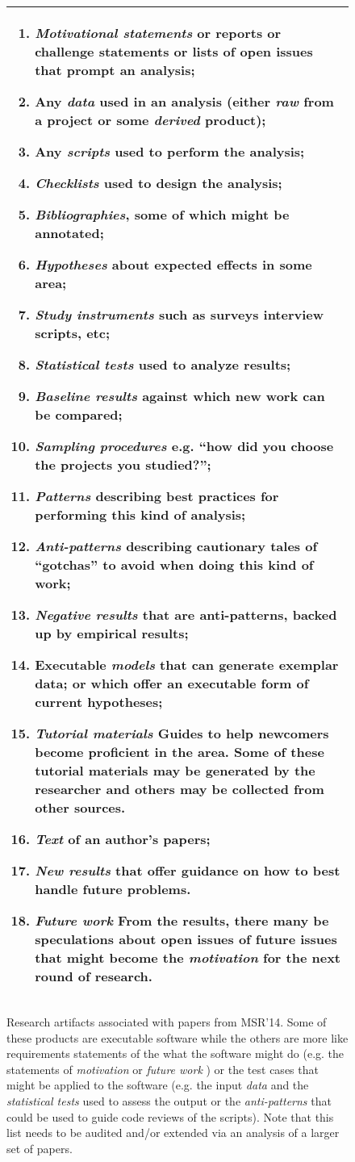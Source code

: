 \documentclass[journal]{IEEEtran}
\newcommand{\be}{\begin{enumerate}}
\newcommand{\ee}{\end{enumerate}}
\begin{document}
\begin{figure}[!t]
\begin{tabular}{|p{.95\linewidth}|}\hline
\small
\be
\item {\em Motivational statements}  or reports or challenge statements or lists of open issues that prompt an analysis;
\item  Any {\em data} used in an analysis (either {\em raw} from a project or some
      {\em derived} product);
\item Any {\em scripts} used to perform the analysis;
\item {\em Checklists} used to design the analysis;
\item {\em Bibliographies}, some of which might be annotated;
\item {\em Hypotheses} about expected effects in some area;
\item {\em Study instruments} such as surveys interview scripts, etc;
\item {\em Statistical tests} used to analyze results;

\item {\em Baseline results} against which new work can be compared;
\item {\em Sampling procedures} e.g. ``how did you choose the projects you studied?'';
\item {\em Patterns} describing  best practices for performing this kind of analysis;
\item {\em Anti-patterns}  describing cautionary tales of ``gotchas'' to avoid when doing this kind of work;
\item {\em Negative results} that are anti-patterns, backed up by empirical results;
\item Executable {\em models} that can generate exemplar data;  or which offer an executable form of current hypotheses;
\item {\em Tutorial materials} Guides to help  newcomers become proficient in the area. Some of these tutorial materials
      may be generated by the researcher
and others may be collected from other sources.
\item {\em Text} of an author's papers;
\item {\em New results}  that offer guidance on how to best handle future problems.
\item {\em Future work} From the results, there many be speculations about open issues of
      future issues that might become the {\em motivation} for the
      next round of research.
\ee
\\\hline
\end{tabular}
\caption{
Research artifacts associated with papers from MSR'14. Some of these products are executable software while the others are more like requirements statements of the what the software might do (e.g. the statements of {\em motivation} or {\em future work} ) 
or the test cases that might be applied to the software (e.g. the input {\em data} and the  {\em statistical tests} used to assess the output or the 
{\em anti-patterns} that could be used to guide code reviews of the scripts).
Note that this list needs to be audited and/or extended via an analysis of a larger set of papers.}\label{fig:types}
\end{figure} 
\end{document}
